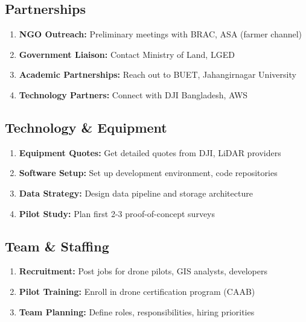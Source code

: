 \subsection{Partnerships}

\begin{enumerate}
    \item [\checkmark] \textbf{NGO Outreach:} Preliminary meetings with BRAC, ASA (farmer channel)
    \item [\checkmark] \textbf{Government Liaison:} Contact Ministry of Land, LGED
    \item [\checkmark] \textbf{Academic Partnerships:} Reach out to BUET, Jahangirnagar University
    \item [\checkmark] \textbf{Technology Partners:} Connect with DJI Bangladesh, AWS
\end{enumerate}

\subsection{Technology \& Equipment}

\begin{enumerate}
    \item [\checkmark] \textbf{Equipment Quotes:} Get detailed quotes from DJI, LiDAR providers
    \item [\checkmark] \textbf{Software Setup:} Set up development environment, code repositories
    \item [\checkmark] \textbf{Data Strategy:} Design data pipeline and storage architecture
    \item [\checkmark] \textbf{Pilot Study:} Plan first 2-3 proof-of-concept surveys
\end{enumerate}

\subsection{Team \& Staffing}

\begin{enumerate}
    \item [\checkmark] \textbf{Recruitment:} Post jobs for drone pilots, GIS analysts, developers
    \item [\checkmark] \textbf{Pilot Training:} Enroll in drone certification program (CAAB)
    \item [\checkmark] \textbf{Team Planning:} Define roles, responsibilities, hiring priorities
\end{enumerate}

